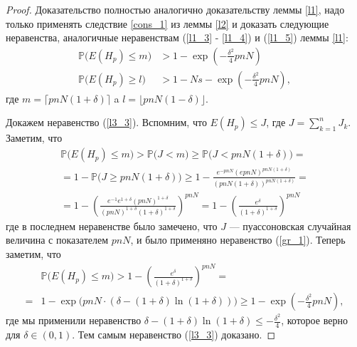 \documentclass{matmex-diploma-custom}
\newcommand{\PRob}{\mathbb P}
\newcommand{\leqs}{\leqslant}
\newcommand{\geqs}{\geqslant}
\theoremstyle{named}
\begin{document}
\begin{proof}
Доказательство полностью аналогично доказательству леммы \ref{l1}, надо только применять следствие \ref{cons_1} из леммы \ref{l2}
и доказать следующие неравенства, 
аналогичные неравенствам (\ref{l1_3} - \ref{l1_4}) и (\ref{l1_5}) леммы \ref{l1}:
\begin{align} \label{l3_3}
\PRob\big( E(H_p) \leqs m \big) &> 1 - \exp\left(-\frac{\delta^2}{4}pnN\right)
\\ \label{l3_4}
\PRob\big( E(H_p) \geqs l \big) &> 1 - Ns - \exp\left(-\frac{\delta^2}{4}pnN\right),
\end{align}
где $m = \lceil pnN(1+\delta) \rceil$ a  $l = \lfloor pnN(1-\delta) \rfloor$.

Докажем неравенство (\ref{l3_3}). Вспомним, что $E(H_p) \leqs J$, где $J = \sum\limits_{k = 1}^n J_k$. Заметим, что
\begin{equation}\label{l3_5}\begin{aligned}
\PRob\big( E(H_p) \leqs m \big) > \PRob\big( J < m \big) \geqs \PRob\big( J < pnN(1+\delta) \big) 
=
\\
= 
1 - \PRob\big( J \geqs pnN(1+\delta) \big) \geqs 1 - \frac{e^{-pnN}(epnN)^{pnN(1+\delta)}}{(pnN(1+\delta))^{pnN(1+\delta)}}
=
\\
=
1 - \left( \frac{e^{-1} e^{1+\delta}(pnN)^{1+\delta}}{(pnN)^{1+\delta}(1+\delta)^{1+\delta}} \right)^{pnN}
=
1 - \left( \frac{e^\delta}{(1+\delta)^{1+\delta}} \right)^{pnN}
\end{aligned}\end{equation}
где в последнем неравенстве было замечено, что $J$ --- пуассоновская случайная величина с показателем $pnN$, 
и было применяно неравенство (\ref{gr_1}).
Теперь заметим, что 
\begin{equation}\begin{aligned}
&\PRob\big( E(H_p) \leqs m \big) > 1 - \left( \frac{e^\delta}{(1+\delta)^{1+\delta}} \right)^{pnN}
=
\\
=
&1 - \exp\big(pnN \cdot (\delta - (1+\delta) \ln(1+\delta)) \big)
\geqs
 1 - \exp\left(-\frac{\delta^2}{4}pnN\right),
\end{aligned}\end{equation}
где мы применили неравенство $\delta - (1+\delta) \ln(1+\delta) \leqs - \frac{\delta^2}{4}$, 
которое верно для $\delta \in (0,1)$. Тем самым неравенство (\ref{l3_3}) доказано.


\end{proof}
\end{document}

